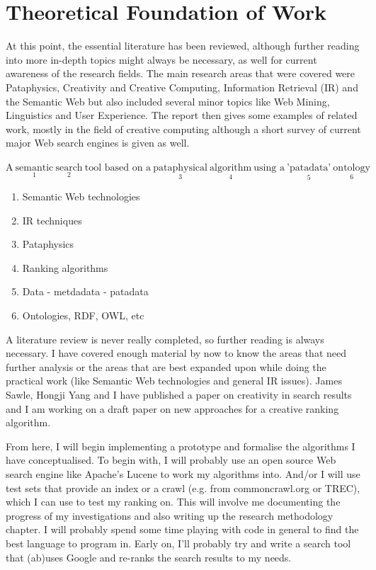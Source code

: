 
\chapter{Theoretical Foundation of Work}
\label{ch:theoretical}

At this point, the essential literature has been reviewed, although further reading into more in-depth topics might always be necessary, as well for current awareness of the research fields. The main research areas that were covered were Pataphysics, Creativity and Creative Computing, Information Retrieval (IR) and the Semantic Web but also included several minor topics like Web Mining, Linguistics and User Experience. The report then gives some examples of related work, mostly in the field of creative computing although a short survey of current major Web search engines is given as well.

$\text{A} \ \underset{1}{\text{semantic}} \ \underset{2}{\text{search}} \ \text{tool based on a} \ \underset{3}{\text{pataphysical}} \ \underset{4}{\text{algorithm}} \ \text{using a} \ \underset{5}{\text{'patadata'}} \ \underset{6}{\text{ontology}}$

\begin{enumerate}
  \item Semantic Web technologies
  \item IR techniques
  \item Pataphysics
  \item Ranking algorithms
  \item Data - metdadata - patadata
  \item Ontologies, RDF, OWL, etc
\end{enumerate}

A literature review is never really completed, so further reading is always necessary. I have covered enough material by now to know the areas that need further analysis or the areas that are best expanded upon while doing the practical work (like Semantic Web technologies and general IR issues). James Sawle, Hongji Yang and I have published a paper on creativity in search results and I am working on a draft paper on new approaches for a creative ranking algorithm.

From here, I will begin implementing a prototype and formalise the algorithms I have conceptualised. To begin with, I will probably use an open source Web search engine like Apache's Lucene to work my algorithms into. And/or I will use test sets that provide an index or a crawl (e.g. from commoncrawl.org or TREC), which I can use to test my ranking on.  This will involve me documenting the progress of my investigations and also writing up the research methodology chapter. I will probably spend some time playing with code in general to find the best language to program in. Early on, I'll probably try and write a search tool that (ab)uses Google and re-ranks the search results to my needs.

